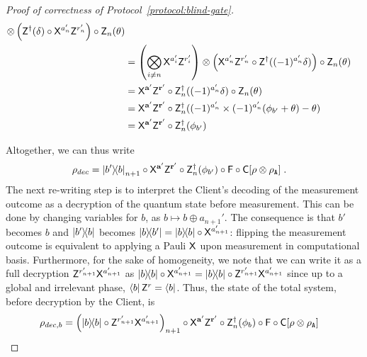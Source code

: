 \begin{proof}[Proof of correctness of Protocol~\ref{protocol:blind-gate}]
\begin{align}
            \otimes
            \left(\Z^{\dagger}(\delta) \circ \X^{a_n'}\Z^{r_n'}\right)
            \circ \Z_{n}(\theta)
            \\
            &=
            \left(\bigotimes_{i\neq n}\X^{a'_i}\Z^{r'_i}\right)
            \otimes
            \left(
                \X^{a_n'}\Z^{r_n'}
                \circ
                \Z^{\dagger}((-1)^{a_n'}\delta)
            \right)
            \circ \Z_{n}(\theta)
            \\
            &=
            \Enc{\a'}{\r'}
            \circ
            \Z_n^{\dagger}((-1)^{a_n'}\delta)
            \circ \Z_{n}(\theta)
            \\
            &=
            \Enc{\a'}{\r'}
            \circ
            \Z_n^{\dagger}((-1)^{a'_n}\times(-1)^{a_n'}(\phi_{b'}+\theta)-\theta)
            \\
            &=
            \Enc{\a'}{\r'}
            \circ
            \Z_n^{\dagger}(\phi_{b'})
        \end{align}

        Altogether, we can thus write
        \begin{align}
            \rho_{dec}
            &=
            \ketbra{b'}{b}_{n+1}
            \circ
            \X^{\a'}
            \Z^{\r'}
            \circ
            \Z_n^\dagger(\phi_{b'})
            \circ
            \F
            \circ
            \C
        [
            \rho\otimes \rho_\Apattern
        ]\; .
        \end{align}
        The next re-writing step is to interpret the Client's decoding of the measurement outcome as a decryption of the quantum state before measurement. This can be done by changing variables for $b$, as $b\mapsto b\oplus a_{n+1}'$. The consequence is that $b'$ becomes $b$ and $\ketbra{b'}{b}$ becomes $\ketbra{b}{b'} = \ketbra{b} \circ \X^{a_{n+1}'}$: flipping the measurement outcome is equivalent to applying a Pauli $\X$ upon measurement in computational basis. Furthermore, for the sake of homogeneity, we note that we can write it as a full decryption $\Dec{a'_{n+1}}{r'_{n+1}}$ as $\ketbra{b} \circ \X^{a_{n+1}'} = \ketbra{b} \circ \Z^{r'_{n+1}}\X^{a_{n+1}'}$ since up to a global and irrelevant phase, $\bra b \Z^r = \bra b$. Thus, the state of the total system, before decryption by the Client, is
        \begin{align}
            \rho_{dec, b}
            &=
            \left(
            \ketbra{b}{b}
            \circ
                \Dec{a'_{n+1}}{r'_{n+1}}\right)_{n+1}
            \circ
            \Enc{\a'}{\r'}
            \circ
            \Z_n^\dagger(\phi_{b})
            \circ
            \F
            \circ
            \C
        [
            \rho\otimes \rho_\A
        ]
    \end{align}

\end{proof}
